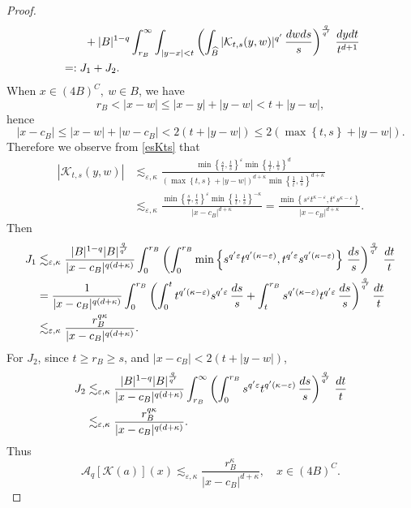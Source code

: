 \documentclass[oneside,english,a4wide]{amsart}
\numberwithin{equation}{section}
\numberwithin{figure}{section}
\theoremstyle{plain}
\theoremstyle{plain}
\theoremstyle{definition}
\theoremstyle{plain}
\theoremstyle{remark}
\theoremstyle{definition}
\theoremstyle{remark}
\theoremstyle{definition}
\newcommand{\A}{{\mathcal A}}
\newcommand{\e}{\varepsilon}
\newcommand{\8}{+\infty}
\renewcommand{\1}{\mathbbm{1}}
\newcommand{\wh}{\widehat}
\newcommand{\K}{{\mathcal K}}
\newcommand\sk[1]{ \left( #1 \right) }
\newcommand\lk[1]{ \left\{ #1 \right\} }
\renewcommand\d{{\rm d}}
\begin{document}
{\begin{proof}
\[\begin{aligned}
    & \qquad + |B|^{1-q}\int_{r_B}^{\infty}\int_{|y - x| < t} \sk{ \int_{\wh{B}} |\K_{t, s}(y, w)|^{q'}\, \frac{\d w\d s}{s} }^{\frac{q}{q'}}\, \frac{\d y \d t}{t^{d+1}} \\
    & =: J_1 + J_2.
\end{aligned}
\]
When $x \in (4B)^C,\ w \in B$, we have 
\[
    r_B < |x - w| \leq |x - y| + |y- w| < t+|y-w|,
\]
hence 
\[
    |x - c_B| \leq |x - w| +|w- c_B| < 2(t + |y-w|) \leq 2(\max\lk{t, s} + |y-w|).
\]
Therefore we observe from \eqref{esKts} that 
\[
\begin{aligned}
    |\K_{t, s}(y, w)| & \lesssim_{\e, \kappa} \frac{ \min\lk{ \frac{s}{t}, \frac{t}{s} }^{ \e } \min\lk{ \frac{1}{t}, \frac{1}{s} }^{d} }{ \sk{ \max\lk{t, s} + |y - w| }^{d + \kappa}\min\lk{\frac{1}{t}, \frac{1}{s}}^{d + \kappa } }\\
    & \lesssim_{\e, \kappa} \frac{ \min\lk{ \frac{s}{t}, \frac{t}{s} }^{ \e } \min\lk{ \frac{1}{t}, \frac{1}{s} }^{-\kappa} }{ |x - c_B|^{d + \kappa} } = \frac{ \min\lk{ s^\e t^{\kappa-\e}, t^\e s^{\kappa-\e} } }{ |x - c_B|^{d + \kappa} }.
\end{aligned}
\]
Then
    \[
    \begin{aligned}
        J_1 & \lesssim_{\e, \kappa} \frac{|B|^{1-q}|B|^{\frac{q}{q'}}}{|x - c_B|^{q(d + \kappa)}}\int_0^{r_B}\sk{ \int_0^{r_B}  \min\lk{ s^{q'\e} t^{q'(\kappa-\e)}, t^{q'\e} s^{q'(\kappa-\e)} } \, \frac{\d s}{s} }^{\frac{q}{q'}} \, \frac{ \d t}{t} \\
        & = \frac{ 1 }{|x - c_B|^{q(d + \kappa)} }\int_0^{r_B}\sk{ \int_0^{t} t^{q'(\kappa-\e)}s^{q'\e} \,\frac{\d s}{s} + \int_{t}^{r_B} s^{q'(\kappa- \e) }t^{q'\e} \,\frac{\d s}{s} }^{\frac{q}{q'}}\frac{\d t}{t}\\
        & \lesssim_{\e, \kappa} \frac{ r_B^{q\kappa} }{|x - c_B|^{q(d + \kappa)} }.
    \end{aligned}
    \]
    For $J_2$, since $t \geq  r_B \geq s$, and $|x - c_B| < 2(t + |y - w|)$,
    \[
    \begin{aligned}
        J_2 & \lesssim_{\e, \kappa} \frac{|B|^{1-q}|B|^{\frac{q}{q'}}  }{|x - c_B|^{q(d + \kappa)}} \int_{r_B}^{\infty} \sk{ \int_0^{r_B} s^{q' \e} t^{q'(\kappa-\e ) }  \, \frac{\d s}{s} }^{\frac{q}{q'}}\, \frac{ \d t}{t} \\
        & \lesssim_{\e, \kappa} \frac{ r_B^{q\kappa } }{|x - c_B|^{q(d + \kappa)} }.
    \end{aligned}
    \]
Thus
\[
    \A_q[\K(a)](x) \lesssim_{\e, \kappa} \frac{ r_B^{\kappa } }{|x - c_B|^{d + \kappa} }, \quad x \in (4B)^C.
\]
\end{proof}}
\end{document}
